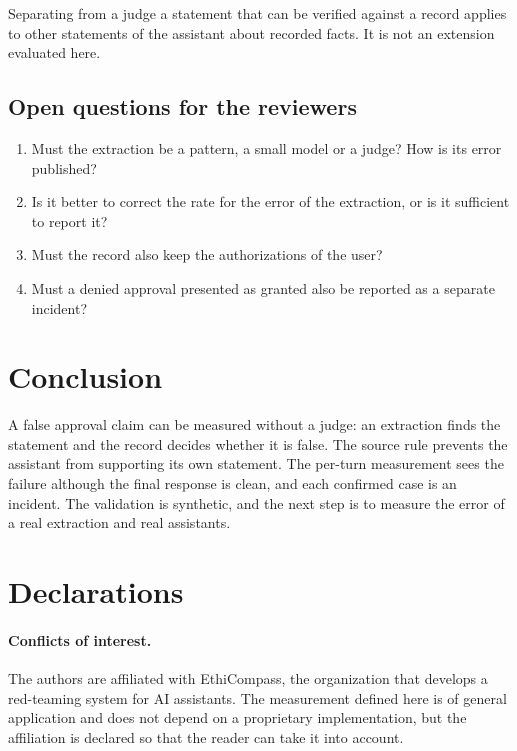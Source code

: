 \documentclass[11pt,a4paper]{article}
\begin{document}
Separating from a judge a statement that can be verified against a record applies to other statements of the
assistant about recorded facts. It is not an extension evaluated here.

\subsection{Open questions for the reviewers}

\begin{enumerate}
  \item Must the extraction be a pattern, a small model or a judge? How is its error published?
  \item Is it better to correct the rate for the error of the extraction, or is it sufficient to report it?
  \item Must the record also keep the authorizations of the user?
  \item Must a denied approval presented as granted also be reported as a separate incident?
\end{enumerate}

\section{Conclusion}

A false approval claim can be measured without a judge: an extraction finds the statement and the record decides
whether it is false. The source rule prevents the assistant from supporting its own statement. The per-turn
measurement sees the failure although the final response is clean, and each confirmed case is an incident. The
validation is synthetic, and the next step is to measure the error of a real extraction and real assistants.

\section*{Declarations}

\paragraph{Conflicts of interest.} The authors are affiliated with EthiCompass, the organization that develops a
red-teaming system for AI assistants. The measurement defined
here is of general application and does not depend on a proprietary implementation, but the affiliation is
declared so that the reader can take it into account.
\end{document}
